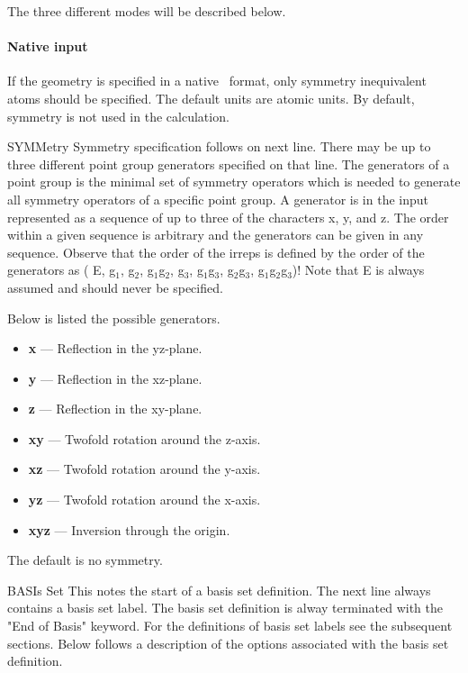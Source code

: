 The three different modes will be described below.

\paragraph{Native input}
If the geometry is specified in a native \molcas\ format, only symmetry
inequivalent atoms should be specified. The default units are atomic units.
By default, symmetry is not used in the calculation.

\begin{keywordlist}
\item[SYMMetry]
 Symmetry specification follows on next line. There may be up to
three different point group generators specified on that line. The
generators of a point group is the minimal set of symmetry operators
which is needed to generate all symmetry
operators of a specific point group. A generator is in the input
represented as a sequence of up to three of the characters x, y, and
z. The order within a given sequence is arbitrary and the generators
can be given in any sequence. Observe that the order of the irreps
is defined by the order of the generators as
( E, g$_1$, g$_2$, g$_1$g$_2$, g$_3$, g$_1$g$_3$, g$_2$g$_3$,
g$_1$g$_2$g$_3$)! Note that E is always assumed and should never
be specified.

Below is listed the possible generators.
\begin{itemize}
\item {\bf x} --- Reflection in the yz-{}plane.
\item {\bf y} --- Reflection in the xz-{}plane.
\item {\bf z} --- Reflection in the xy-{}plane.
\item {\bf xy} --- Twofold rotation around the z-{}axis.
\item {\bf xz} --- Twofold rotation around the y-{}axis.
\item {\bf yz} --- Twofold rotation around the x-{}axis.
\item {\bf xyz} --- Inversion through the origin.
\end{itemize}
The default is no symmetry.
\item[BASIs Set]
This notes the start of a basis set definition.
The next line always contains a basis set label.
The basis set definition is alway terminated with the "End of Basis" keyword.
For the definitions of basis set labels see the subsequent sections.
Below follows a description of the options associated with the
basis set definition.


\end{keywordlist}
